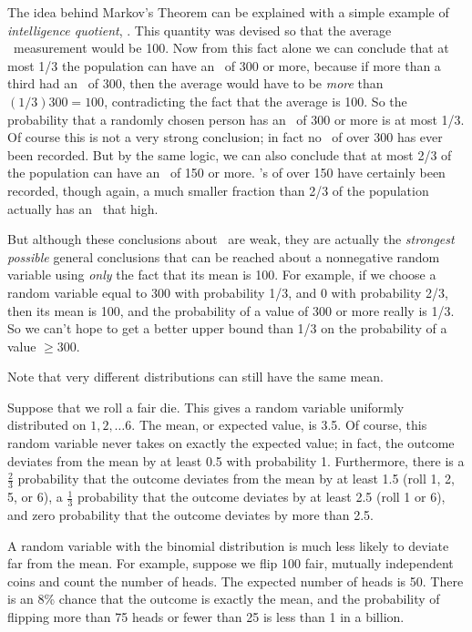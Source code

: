 The idea behind Markov's Theorem can be explained with a simple example of
\emph{intelligence quotient}, \IQ.  This quantity was devised so that the
average \IQ\ measurement would be 100.  Now from this fact alone we can
conclude that at most 1/3 the population can have an \IQ\ of 300 or more,
because if more than a third had an \IQ\ of 300, then the average would
have to be \emph{more} than $(1/3)300 = 100$, contradicting the fact that
the average is 100.  So the probability that a randomly chosen person has
an \IQ\ of 300 or more is at most 1/3.  Of course this is not a very
strong conclusion; in fact no \IQ\ of over 300 has ever been recorded.
But by the same logic, we can also conclude that at most 2/3 of the
population can have an \IQ\ of 150 or more.  \IQ's of over 150 have
certainly been recorded, though again, a much smaller fraction than 2/3 of
the population actually has an \IQ\ that high.

But although these conclusions about \IQ\ are weak, they are actually the
\emph{strongest possible} general conclusions that can be reached about a
nonnegative random variable using \emph{only} the fact that its mean is
100.  For example, if we choose a random variable equal to 300 with
probability 1/3, and 0 with probability 2/3, then its mean is 100, and the
probability of a value of 300 or more really is 1/3.  So we can't hope to
get a better upper bound than 1/3 on the probability of a value
$\geq 300$.

\iffalse
Note that very different distributions can still have the same mean.

\begin{example}
  Suppose that we roll a fair die.  This gives a random variable
  uniformly distributed on $1, 2, \dots 6$.  The mean, or expected
  value, is 3.5.  Of course, this random variable never takes on
  exactly the expected value; in fact, the outcome deviates from the
  mean by at least 0.5 with probability 1.  Furthermore, there is a
  $\frac{2}{3}$ probability that the outcome deviates from the mean by
  at least 1.5 (roll 1, 2, 5, or 6), a $\frac{1}{3}$ probability that
  the outcome deviates by at least 2.5 (roll 1 or 6), and zero
  probability that the outcome deviates by more than 2.5.
\end{example}

\begin{example}
  A random variable with the binomial distribution is much less likely
  to deviate far from the mean.  For example, suppose we flip 100
  fair, mutually independent coins and count the number of heads.  The
  expected number of heads is 50.  There is an 8\% chance that the
  outcome is exactly the mean, and the probability of flipping more
  than 75 heads or fewer than 25 is less than 1 in a billion.
\end{example}

